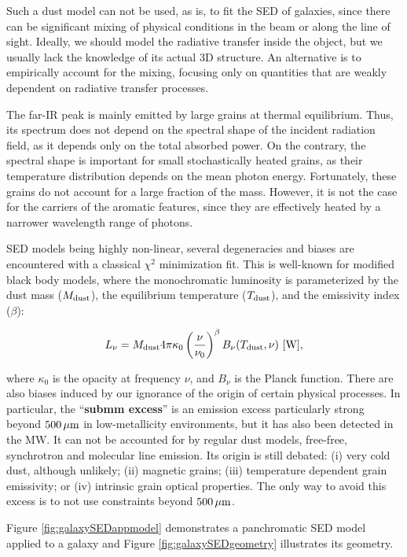 \documentclass[a4paper,10pt]{article}
\begin{document}
{\noindent}Such a dust model can not be used, as is, to fit the SED of galaxies, since there can be significant mixing of physical conditions in the beam or along the line of sight. Ideally, we should model the radiative transfer inside the object, but we usually lack the knowledge of its actual 3D structure. An alternative is to empirically account for the mixing, focusing only on quantities that are weakly dependent on radiative transfer processes.

{\noindent}The far-IR peak is mainly emitted by large grains at thermal equilibrium. Thus, its spectrum does not depend on the spectral shape of the incident radiation field, as it depends only on the total absorbed power. On the contrary, the spectral shape is important for small stochastically heated grains, as their temperature distribution depends on the mean photon energy. Fortunately, these grains do not account for a large fraction of the mass. However, it is not the case for the carriers of the aromatic features, since they are effectively heated by a narrower wavelength range of photons.

{\noindent}SED models being highly non-linear, several degeneracies and biases are encountered with a classical $\chi^2$ minimization fit. This is well-known for modified black body models, where the monochromatic luminosity is parameterized by the dust mass ($M_{\rm dust}$), the equilibrium temperature ($T_{\rm dust}$), and the emissivity index ($\beta$):

\begin{align*}
    L_\nu = M_{\rm dust} 4\pi\kappa_0 \left(\frac{\nu}{\nu_0}\right)^\beta B_\nu (T_{\rm dust},\nu) ~ [{\rm W}],
\end{align*}

{\noindent}where $\kappa_0$ is the opacity at frequency $\nu$, and $B_\nu$ is the Planck function. There are also biases induced by our ignorance of the origin of certain physical processes. In particular, the ``\textbf{submm excess}'' is an emission excess particularly strong beyond $500\,\mu{\rm m}$ in low-metallicity environments, but it has also been detected in the MW. It can not be accounted for by regular dust models, free-free, synchrotron and molecular line emission. Its origin is still debated: (i) very cold dust, although unlikely; (ii) magnetic grains; (iii) temperature dependent grain emissivity; or (iv) intrinsic grain optical properties. The only way to avoid this excess is to not use constraints beyond $500\,\mu{\rm m}$.

{\noindent}Figure \ref{fig:galaxySEDappmodel} demonstrates a panchromatic SED model applied to a galaxy and Figure \ref{fig:galaxySEDgeometry} illustrates its geometry.
\end{document}
